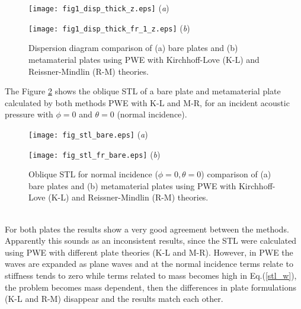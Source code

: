 \documentclass[a4paper]{ICEDyn}
\begin{document}
\begin{figure}
	\begin{minipage} {.50\linewidth}
		\centering 
		\texttt{[image: fig1\_disp\_thick\_z.eps]}
		{(\textit{a})}%
	\end{minipage}\hfill
	\begin{minipage}{.50\linewidth}
		\centering
		\texttt{[image: fig1\_disp\_thick\_fr\_1\_z.eps]}
		{(\textit{b})} %
	\end{minipage}\hfill
	\caption{Dispersion diagram comparison of (a) bare plates and (b) metamaterial plates using PWE with Kirchhoff-Love (K-L) and Reissner-Mindlin (R-M) theories.}
	\label{disp1}
\end{figure}

The Figure \ref{disp2} shows the oblique STL of a bare plate and metamaterial plate calculated by both methods PWE with K-L and M-R, for an incident acoustic pressure with $\phi = $0 and $ \theta = $0 (normal incidence). 
\begin{figure}
	\begin{minipage} {.50\linewidth}
		\centering 
		\texttt{[image: fig\_stl\_bare.eps]}
		{(\textit{a})}%
	\end{minipage}\hfill
	\begin{minipage}{.50\linewidth}
		\centering		\texttt{[image: fig\_stl\_fr\_bare.eps]}
		{(\textit{b})} %
	\end{minipage}\hfill
	\caption{Oblique STL for normal incidence ($\phi = 0, \theta = 0$) comparison of (a) bare plates and (b) metamaterial plates using PWE with Kirchhoff-Love (K-L) and Reissner-Mindlin (R-M) theories.}
	\label{disp2}
\end{figure}
\\
For both plates the results show a very good agreement between the methods. Apparently this sounds as an inconsistent results, since the STL were calculated using PWE with different plate theories (K-L and M-R). However, in PWE the waves are expanded as plane waves and at the normal incidence terms relate to stiffness tends to zero while terms related to mass becomes high in Eq.(\ref{stl_w}), the problem becomes mass dependent, then the differences in plate formulations (K-L and R-M) disappear and the results match each other.
\newpage

\end{document}

